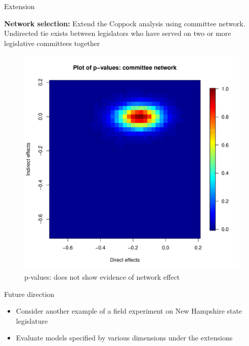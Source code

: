 \documentclass[final]{beamer}
\newlength{\onecolwid}
\newlength{\onecolwidd}
\begin{document}
\begin{frame}[t]
\begin{columns}[t]
\begin{column}{\onecolwidd}
\begin{block}{Extension}
\begin{rmfamily}
	\textbf{Network selection:}
	Extend the Coppock analysis using committee network. Undirected tie exists between legislators who have served on two or more legislative committees together
	
	\hspace{2cm}
	\begin{figure}
	\centering
	\includegraphics[scale=0.7]{pvalues_figure_committee.pdf}
	\caption{p-values: does not show evidence of network effect}
	\end{figure}
			
	\end{rmfamily}						
	\end{block}
	
	\vspace*{10mm}
	\begin{block}{Future direction}
	\begin{rmfamily}
	
	\begin{itemize}
	\item Consider another example of a field experiment on New Hampshire state legislature
	\vspace*{.1in}
	\item Evaluate models specified by various dimensions under the extensions
	\vspace*{.1in}
	\end{itemize}
		

\end{rmfamily}
\end{block}
\end{column}
\end{columns}
\end{frame}
\end{document}
